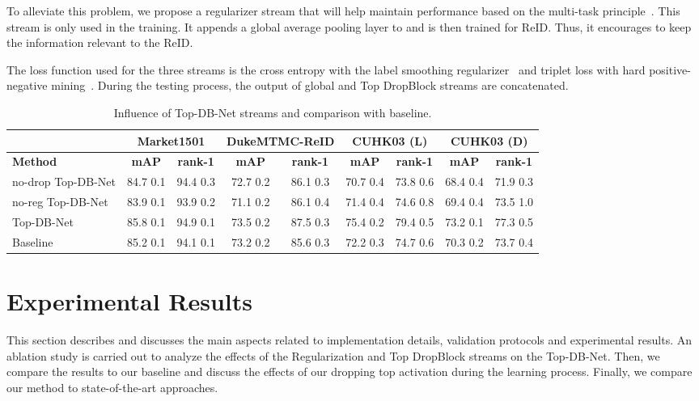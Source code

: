 \documentclass[a4paper,conference]{IEEEtran}
\begin{document}
To alleviate this problem, we propose a regularizer stream that will help maintain performance based on the multi-task principle~\cite{goodfellow2016deep}. This stream is only used in the training. It appends a global average pooling layer to  and is then trained for ReID. Thus, it encourages  to keep the information relevant to the ReID.
 
The loss function used for the three streams is the cross entropy with the label smoothing regularizer~\cite{szegedy2016rethinking} and triplet loss with hard positive-negative mining~\cite{hermans2017defense}. During the testing process, the output of global and Top DropBlock streams are concatenated.
 
\begin{table*}[!htb]
  \renewcommand{\arraystretch}{0.86}
  \setlength{\tabcolsep}{3.0mm}
  \centering
  \caption{Influence of Top-DB-Net streams and comparison with baseline.}
  \label{table:ablation}
  \begin{tabular}{lcccccccc}
  \toprule
  & \multicolumn{2}{c}{\textbf{Market1501}} & \multicolumn{2}{c}{\textbf{DukeMTMC-ReID}} & \multicolumn{2}{c}{\textbf{CUHK03 (L)}} & \multicolumn{2}{c}{\textbf{CUHK03 (D)}}\\
  \midrule
  \textbf{Method} & \textbf{mAP} & \textbf{rank-1} & \textbf{mAP} & \textbf{rank-1} & \textbf{mAP} & \textbf{rank-1} & \textbf{mAP} & \textbf{rank-1} \\
  \midrule
  no-drop Top-DB-Net & 84.7  0.1 & 94.4  0.3 & 72.7  0.2 & 86.1  0.3 & 70.7  0.4 & 73.8  0.6 & 68.4  0.4 & 71.9  0.3 \\
  no-reg Top-DB-Net  & 83.9  0.1 & 93.9  0.2 & 71.1  0.2 & 86.1  0.4 & 71.4  0.4 & 74.6  0.8 & 69.4  0.4 & 73.5  1.0 \\
  Top-DB-Net         & 85.8  0.1 & 94.9  0.1 & 73.5  0.2 & 87.5  0.3 & 75.4  0.2 & 79.4  0.5 & 73.2  0.1 & 77.3  0.5 \\
  Baseline                          & 85.2  0.1 & 94.1  0.1 & 73.2  0.2 & 85.6  0.3 & 72.2  0.3 & 74.7  0.6 & 70.3  0.2 & 73.7  0.4 \\
  \bottomrule
  \end{tabular}
\end{table*}
 
\section{Experimental Results}
\label{sec:results}
 
This section describes and discusses the main aspects related to implementation details, validation protocols and experimental results. An ablation study is carried out to analyze the effects of the Regularization and Top DropBlock streams on the Top-DB-Net. Then, we compare the results to our baseline and discuss the effects of our dropping top activation during the learning process. Finally, we compare our method to state-of-the-art approaches.
\end{document}
